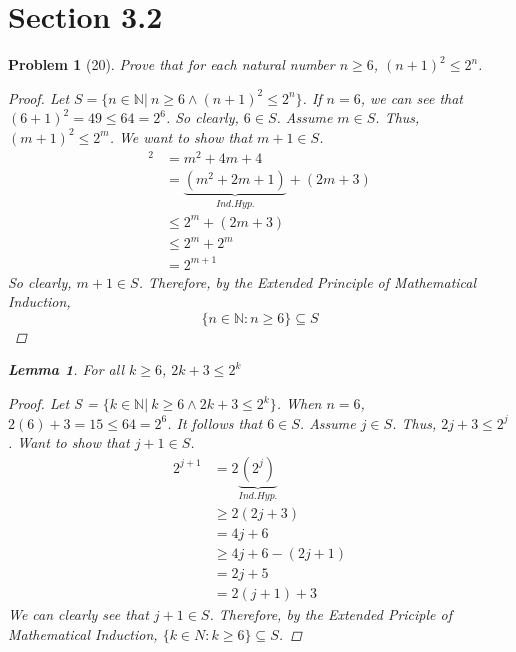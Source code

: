 \documentclass{article}
\theoremstyle{problem}
\newtheorem{prob}{Problem}
\theoremstyle{plain}
\newtheorem{lem}{Lemma}
\begin{document}
  \section*{Section 3.2}
  \begin{prob}[20]
    Prove that for each natural number $n \geq 6$, $(n + 1)^2 \leq 2^n$.
    \begin{multicols}{2}      

      \begin{proof}
        Let $S = \{n \in \mathbb{N} |\ n \geq 6 \wedge (n + 1)^2 \leq 2^n\}$. If $n = 6$, we can see that $(6+1)^2 = 49 \leq 64 = 2^6$. So clearly, $6 \in S$. Assume $m \in S$. Thus, $(m + 1)^2 \leq 2^m$. We want to show that $m + 1 \in S$.
        \begin{align*}
          [(m+1) + 1]^2 &= m^2 + 4m + 4\\
          &= \underbrace{(m^2 + 2m + 1)}_{Ind. Hyp.} + (2m + 3)\\
          &\leq 2^m + (2m + 3)\\
          &\leq 2^m + 2^m \tag*{(Lemma)}\\
          &=2^{m+1}
        \end{align*}
        So clearly, $m + 1 \in S$. Therefore, by the Extended Principle of Mathematical Induction, $$\{n \in \mathbb{N} : n \geq 6\} \subseteq S$$
      \end{proof}     
      \vfill
      \columnbreak
      \begin{lem}
        For all $k \geq 6$, $2k + 3 \leq 2^k$
        \begin{proof}
          Let S = $\{k \in \mathbb{N} |\ k \geq 6 \wedge 2k + 3 \leq 2^k\}$. When $n = 6$, $2(6) + 3 = 15 \leq 64 = 2^6$. It follows that $6 \in S$. Assume $j \in S$. Thus, $2j + 3 \leq 2^j$. Want to show that $j + 1 \in S$.
          \begin{align*}
            2^{j+1} &= 2\underbrace{(2^j)}_{Ind. Hyp.}\\
            &\geq 2(2j+3)\\
            &= 4j + 6\\
            &\geq 4j + 6 - (2j + 1)\\
            &= 2j+5\\
            &= 2(j+1) + 3
          \end{align*}
          We can clearly see that $j + 1 \in S$. Therefore, by the Extended Priciple of Mathematical Induction, $\{k \in N : k \geq 6\} \subseteq S$.
        \end{proof}
      \end{lem}
    \end{multicols}
  \end{prob}
\end{document}
